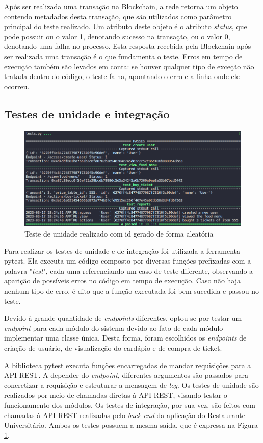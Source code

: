 Após ser realizada uma transação na Blockchain, a rede retorna um objeto contendo metadados desta transação, que são utilizados como parâmetro principal do teste realizado. Um atributo deste objeto é o atributo \emph{status}, que pode possuir ou o valor 1, denotando sucesso na transação, ou o valor 0, denotando uma falha no processo. Esta resposta recebida pela Blockchain após ser realizada uma transação é o que fundamenta o teste. Erros em tempo de execução também são levados em conta: se houver qualquer tipo de exceção não tratada dentro do código, o teste falha, apontando o erro e a linha onde ele ocorreu.

\subsection{Testes de unidade e integração}
\begin{figure}
    \centering
    \includegraphics[width=1\textwidth]{img/Cap3/teste de unidade.png}
    \caption{Teste de unidade realizado com id gerado de forma aleatória}
    \label{fig:teste_unidade}
\end{figure}

Para realizar os testes de unidade e de integração foi utilizada a ferramenta pytest. Ela executa um código composto por diversas funções prefixadas com a palavra "\emph{test}", cada uma referenciando um caso de teste diferente, observando a aparição de possíveis erros no código em tempo de execução. Caso não haja nenhum tipo de erro, é dito que a função executada foi bem sucedida e passou no teste.

Devido à grande quantidade de \emph{endpoints} diferentes, optou-se por testar um \emph{endpoint} para cada módulo do sistema devido ao fato de cada módulo implementar uma classe única. Desta forma, foram escolhidos os \emph{endpoints} de criação de usuário, de visualização do cardápio e de compra de ticket.

A biblioteca pytest executa funções encarregadas de mandar requisições para a API REST. A depender do \emph{endpoint}, diferentes argumentos são passados para concretizar a requisição e estruturar a mensagem de \emph{log}. Os testes de unidade são realizados por meio de chamadas diretas à API REST, visando testar o funcionamento dos módulos. Os testes de integração, por sua vez, são feitos com chamadas à API REST realizadas pelo \emph{back-end} da aplicação do Restaurante Universitário. Ambos os testes possuem a mesma saída, que é expressa na Figura \ref{fig:teste_unidade}.


